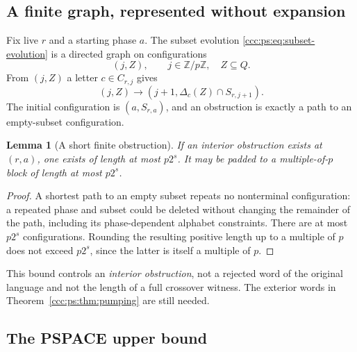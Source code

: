 \documentclass[11pt,letterpaper]{article}
\newtheorem{lemma}[theorem]{Lemma}
\theoremstyle{definition}
\theoremstyle{remark}
\begin{document}
\subsection{A finite graph, represented without expansion}

Fix live $r$ and a starting phase $a$. The subset evolution
\eqref{ccc:ps:eq:subset-evolution} is a directed graph on configurations
\[
 (j,Z),\qquad j\in\mathbb Z/p\mathbb Z,\quad Z\subseteq Q.
\]
From $(j,Z)$ a letter $c\in C_{r,j}$ gives
\begin{equation}\label{ccc:ps:eq:graph-edge}
 (j,Z)\longrightarrow
 (j+1,\Delta_c(Z)\cap S_{r,j+1}).
\end{equation}
The initial configuration is $(a,S_{r,a})$, and an obstruction is exactly
a path to an empty-subset configuration.

\begin{lemma}[A short finite obstruction]\label{ccc:ps:lem:short-obstruction}
If an interior obstruction exists at $(r,a)$, one exists of length at most
$p2^s$. It may be padded to a multiple-of-$p$ block of length at most
$p2^s$.
\end{lemma}
\begin{proof}
A shortest path to an empty subset repeats no nonterminal configuration:
a repeated phase and subset could be deleted without changing the
remainder of the path, including its phase-dependent alphabet constraints.
There are at most $p2^s$ configurations. Rounding the resulting positive
length up to a multiple of $p$ does not exceed $p2^s$, since the latter
is itself a multiple of $p$.
\end{proof}

This bound controls an \emph{interior obstruction}, not a rejected word
of the original language and not the length of a full crossover witness.
The exterior words in Theorem~\ref{ccc:ps:thm:pumping} are still needed.

\subsection{The PSPACE upper bound}
\end{document}
